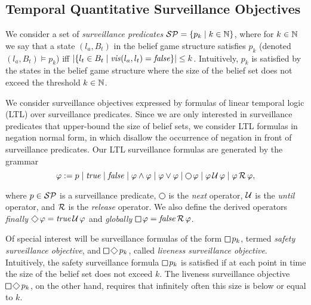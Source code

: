 
\subsection{Temporal Quantitative Surveillance Objectives}

We consider a set of \emph{surveillance predicates} $\mathcal{SP} = \{p_k \mid k \in \mathbb{N}\}$, where for $k \in \mathbb{N}$ we say that a state $(l_a,B_t)$ in the belief game structure satisfies $p_k$ (denoted $(l_a,B_t) \models p_k$) iff 
$|\{l_t \in B_t \mid \mathit{vis}(l_a,l_t)  = \mathit{false} \}| \leq k$. Intuitively, $p_k$ is satisfied by the states in the belief game structure where the size of the belief set does not exceed the threshold $k \in \mathbb{N}$.

We consider surveillance objectives expressed by formulas of linear temporal logic (LTL) over surveillance predicates. Since we are only interested in surveillance predicates that upper-bound the size of belief sets, we consider LTL formulas in negation normal form, in which disallow the occurrence of negation in front of surveillance predicates. Our LTL surveillance formulas  are generated by the grammar
\[\varphi := p \mid \true \mid \false \mid \varphi \wedge \varphi \mid \varphi \vee \varphi \mid \LTLnext  \varphi  \mid \varphi \LTLuntil \varphi \mid \varphi \LTLrelease \varphi,\]

where $p \in \mathcal{SP}$ is a surveillance predicate, $\LTLnext$ is the \emph{next} operator, $\operatorname{\mathcal{U}}$ is the \emph{until} operator, and $\operatorname{\mathcal{R}}$ is the \emph{release} operator. We also define the derived operators 
\emph{finally} $\LTLfinally \varphi = \true \LTLuntil \varphi$ and 
\emph{globally} $\LTLglobally \varphi = \false \LTLrelease \varphi$.

Of special interest will be surveillance formulas of the form $\LTLglobally p_k$, termed \emph{safety surveillance objective}, and $\LTLglobally\LTLfinally p_k$, called \emph{liveness surveillance objective}.
Intuitively, the safety surveillance formula $\LTLglobally p_k$ is satisfied if at each point in time the size of the belief set does not exceed $k$. The liveness surveillance objective $\LTLglobally\LTLfinally p_k$, on the other hand, requires that infinitely often this size is below or equal to $k$.


\begin{example}
\end{example}


